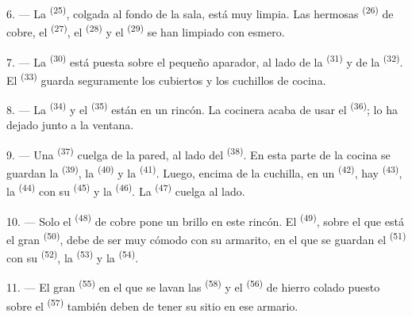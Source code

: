 \VUsaut{4.0mm}
\VUsaut{3.0mm}

6. --- La  \textsuperscript{(25)}, colgada al fondo de la
sala, está muy limpia. Las hermosas  \textsuperscript{(26)} de
cobre, el  \textsuperscript{(27)}, el  \textsuperscript{(28)} y
el  \textsuperscript{(29)} se han limpiado con esmero.

7. --- La  \textsuperscript{(30)} está puesta sobre el pequeño
aparador, al lado de la  \textsuperscript{(31)} y de la
 \textsuperscript{(32)}. El 
\textsuperscript{(33)} guarda seguramente los cubiertos y los cuchillos de cocina.

8. --- La  \textsuperscript{(34)} y el  \textsuperscript{(35)}
están en un rincón. La cocinera acaba de usar el 
\textsuperscript{(36)}; lo ha dejado junto a la ventana.

9. --- Una  \textsuperscript{(37)} cuelga de la pared, al
lado del  \textsuperscript{(38)}. En esta parte de la cocina se
guardan la  \textsuperscript{(39)}, la 
\textsuperscript{(40)} y la  \textsuperscript{(41)}. Luego, encima
de la cuchilla, en un  \textsuperscript{(42)}, hay 
\textsuperscript{(43)}, la  \textsuperscript{(44)} con su 
\textsuperscript{(45)} y la  \textsuperscript{(46)}. La 
\textsuperscript{(47)} cuelga al lado.

10. --- Solo el  \textsuperscript{(48)} de cobre pone un brillo en este
rincón. El  \textsuperscript{(49)}, sobre el que está el gran
 \textsuperscript{(50)}, debe de ser muy cómodo con su armarito, en
el que se guardan el  \textsuperscript{(51)} con su
 \textsuperscript{(52)}, la  \textsuperscript{(53)} y
la  \textsuperscript{(54)}.

\VUsaut{4.0mm}
\VUsaut{3.0mm}

11. --- El gran  \textsuperscript{(55)} en el que se lavan las
 \textsuperscript{(58)} y el  \textsuperscript{(56)} de
hierro colado puesto sobre el  \textsuperscript{(57)} también
deben de tener su sitio en ese armario.

